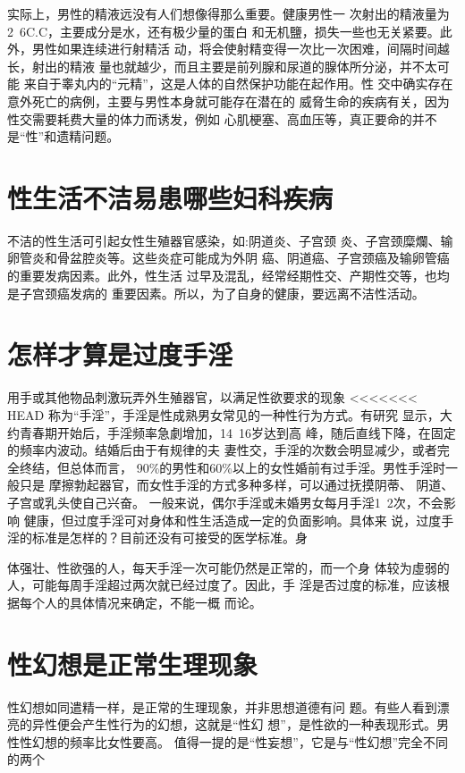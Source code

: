 \documentclass[12pt,UTF8]{ctexbook}
\begin{document}
实际上，男性的精液远没有人们想像得那么重要。健康男性一
次射出的精液量为2~6C.C，主要成分是水，还有极少量的蛋白
和无机鹽，损失一些也无关紧要。此外，男性如果连续进行射精活
动，将会使射精变得一次比一次困难，间隔时间越长，射出的精液
量也就越少，而且主要是前列腺和尿道的腺体所分泌，并不太可能
来自于睾丸内的“元精”，这是人体的自然保护功能在起作用。性
交中确实存在意外死亡的病例，主要与男性本身就可能存在潜在的
威脅生命的疾病有关，因为性交需要耗费大量的体力而诱发，例如
心肌梗塞、高血压等，真正要命的并不是“性”和遗精问题。

\section{性生活不洁易患哪些妇科疾病}

不洁的性生活可引起女性生殖器官感染，如:阴道炎、子宫颈
炎、子宫颈糜爛、输卵管炎和骨盆腔炎等。这些炎症可能成为外阴
癌、阴道癌、子宫颈癌及输卵管癌的重要发病因素。此外，性生活
过早及混乱，经常经期性交、产期性交等，也均是子宫颈癌发病的
重要因素。所以，为了自身的健康，要远离不洁性活动。

\section{怎样才算是过度手淫}

用手或其他物品刺激玩弄外生殖器官，以满足性欲要求的现象
<<<<<<< HEAD
称为“手淫”，手淫是性成熟男女常见的一种性行为方式。有研究
显示，大约青春期开始后，手淫频率急劇增加，14~16岁达到高
峰，随后直线下降，在固定的频率内波动。结婚后由于有规律的夫
妻性交，手淫的次数会明显减少，或者完全终结，但总体而言，
90\%的男性和60\%以上的女性婚前有过手淫。男性手淫时一般只是
摩擦勃起器官，而女性手淫的方式多种多样，可以通过抚摸阴蒂、
阴道、子宫或乳头使自己兴奋。
一般来说，偶尔手淫或未婚男女每月手淫1~2次，不会影响
健康，但过度手淫可对身体和性生活造成一定的负面影响。具体来
说，过度手淫的标准是怎样的？目前还没有可接受的医学标准。身

体强壮、性欲强的人，每天手淫一次可能仍然是正常的，而一个身
体较为虛弱的人，可能每周手淫超过两次就已经过度了。因此，手
淫是否过度的标准，应该根据每个人的具体情况来确定，不能一概
而论。
\section{性幻想是正常生理现象}
性幻想如同遣精一样，是正常的生理现象，并非思想道德有问
题。有些人看到漂亮的异性便会产生性行为的幻想，这就是“性幻
想”，是性欲的一种表现形式。男性性幻想的频率比女性要高。
值得一提的是“性妄想”，它是与“性幻想”完全不同的两个
\end{document}
